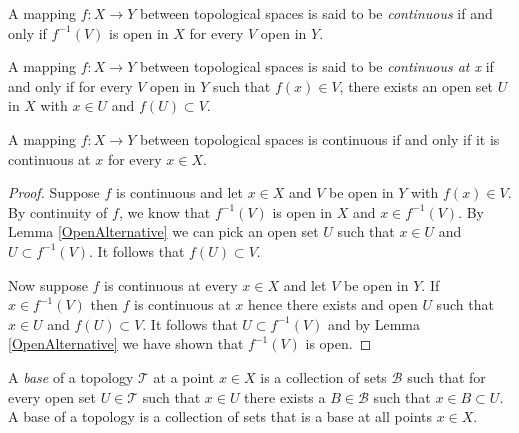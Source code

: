 \begin{defn}A mapping $f : X \to Y$ between topological spaces is said
  to be \emph{continuous} if and only if $f^{-1}(V)$ is open in $X$
  for every $V$ open in $Y$.
\end{defn}
\begin{defn}A mapping $f : X \to Y$ between topological spaces is said
  to be \emph{continuous at x} if and only if for every $V$ open in
  $Y$ such that $f(x) \in V$, there exists an open set $U$ in $X$ with $x \in U$ and $f(U)
  \subset V$.
\end{defn}
\begin{lem}A mapping $f : X \to Y$ between topological spaces is
  continuous if and only if it is continuous at $x$ for every $x \in X$.
\end{lem}
\begin{proof}
Suppose $f$ is continuous and let $x \in X$ and $V$ be open in $Y$
with $f(x) \in V$.  By continuity of $f$, we know that $f^{-1}(V)$ is
open in $X$ and $x \in f^{-1}(V)$.  By Lemma \ref{OpenAlternative} we
can pick an open set $U$ such that $x \in U$ and $U \subset
f^{-1}(V)$.  It follows that $f(U) \subset V$.

Now suppose $f$ is continuous at every $x \in X$ and let $V$ be open
in $Y$.  If $x \in f^{-1}(V)$ then $f$ is continuous at $x$ hence
there exists and open $U$ such that $x \in U$ and $f(U) \subset V$.
It follows that $U \subset f^{-1}(V)$ and by Lemma
\ref{OpenAlternative}  we have shown that $f^{-1}(V)$ is open.
\end{proof}

\begin{defn}A \emph{base} of a topology $\mathcal{T}$ at a point $x
  \in X$ is a collection
  of sets $\mathcal{B}$ such that for every open set $U \in
  \mathcal{T}$ such that $x \in U$ there exists a $B \in \mathcal{B}$ such
  that $x \in B \subset U$.  A base of a topology is a collection of
  sets that is a base at all points $x \in X$.
\end{defn}

